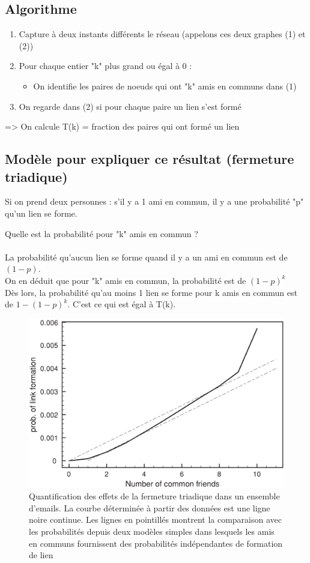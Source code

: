 \subsection{Algorithme}
\begin{enumerate}
\item Capture à deux instants différents le réseau (appelons ces deux graphes (1) et (2))
\item Pour chaque entier "k" plus grand ou égal à 0 :
\begin{itemize}
	\item On identifie les paires de noeuds qui ont "k" amis en communs dans (1)
\end{itemize}
\item On regarde dans (2) si pour chaque paire un lien s'est formé
\end{enumerate}
=> On calcule T(k) = fraction des paires qui ont formé un lien

\subsection{Modèle pour expliquer ce résultat (fermeture triadique)}
Si on prend deux personnes : s'il y a 1 ami en commun, il y a une probabilité "p" qu'un lien se forme.

Quelle est la probabilité pour "k" amis en commun ?

\paragraph*{}
La probabilité qu'aucun lien se forme quand il y a un ami en commun est de $(1-p)$.\\
On en déduit que pour "k" amis en commun, la probabilité est de $ (1-p)^{k}$\\
Dès lors, la probabilité qu'au moins 1 lien se forme pour k amis en commun est de $ 1-(1-p)^{k}$. C'est ce qui est égal à T(k).

\begin{figure}[!ht]
    \centering
    \includegraphics[width=0.8\linewidth]{images/21_emailFriends.png}
    \caption{Quantification des effets de la fermeture triadique dans un
        ensemble d'emails. La courbe déterminée à partir des données est
        une ligne noire continue. Les lignes en pointillés montrent la
        comparaison avec les probabilités depuis deux modèles simples
        dans lesquels les amis en communs fournissent des probabilités
    indépendantes de formation de lien}
    \label{emailFriends}
\end{figure}

